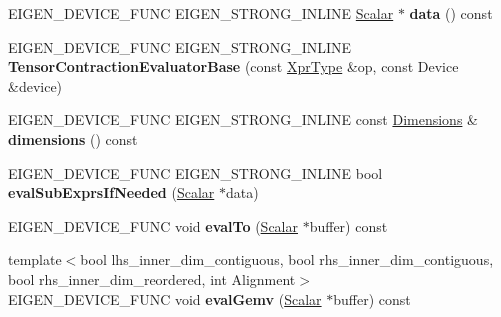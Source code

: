\begin{DoxyCompactItemize}
E\+I\+G\+E\+N\+\_\+\+D\+E\+V\+I\+C\+E\+\_\+\+F\+U\+NC E\+I\+G\+E\+N\+\_\+\+S\+T\+R\+O\+N\+G\+\_\+\+I\+N\+L\+I\+NE \hyperlink{group___sparse_core___module}{Scalar} $\ast$ {\bfseries data} () const
\item 
\mbox{\label{struct_eigen_1_1_tensor_contraction_evaluator_base_aa793ab4101a2169bdf623cd8128389f0}} 
E\+I\+G\+E\+N\+\_\+\+D\+E\+V\+I\+C\+E\+\_\+\+F\+U\+NC E\+I\+G\+E\+N\+\_\+\+S\+T\+R\+O\+N\+G\+\_\+\+I\+N\+L\+I\+NE {\bfseries Tensor\+Contraction\+Evaluator\+Base} (const \hyperlink{class_eigen_1_1_tensor_contraction_op}{Xpr\+Type} \&op, const Device \&device)
\item 
\mbox{\label{struct_eigen_1_1_tensor_contraction_evaluator_base_ab2fe84953c8813277d2139d064d2b4a7}} 
E\+I\+G\+E\+N\+\_\+\+D\+E\+V\+I\+C\+E\+\_\+\+F\+U\+NC E\+I\+G\+E\+N\+\_\+\+S\+T\+R\+O\+N\+G\+\_\+\+I\+N\+L\+I\+NE const \hyperlink{struct_eigen_1_1_d_sizes}{Dimensions} \& {\bfseries dimensions} () const
\item 
\mbox{\label{struct_eigen_1_1_tensor_contraction_evaluator_base_a0cc230491ac304c0be1d6e3dd934587f}} 
E\+I\+G\+E\+N\+\_\+\+D\+E\+V\+I\+C\+E\+\_\+\+F\+U\+NC E\+I\+G\+E\+N\+\_\+\+S\+T\+R\+O\+N\+G\+\_\+\+I\+N\+L\+I\+NE bool {\bfseries eval\+Sub\+Exprs\+If\+Needed} (\hyperlink{group___sparse_core___module}{Scalar} $\ast$data)
\item 
\mbox{\label{struct_eigen_1_1_tensor_contraction_evaluator_base_a9ac0a3d010ff6a0b6b2512dfc0ea75aa}} 
E\+I\+G\+E\+N\+\_\+\+D\+E\+V\+I\+C\+E\+\_\+\+F\+U\+NC void {\bfseries eval\+To} (\hyperlink{group___sparse_core___module}{Scalar} $\ast$buffer) const
\item 
\mbox{\label{struct_eigen_1_1_tensor_contraction_evaluator_base_a72cf4fd8e6ba21d8048818993ac8c945}} 
{\footnotesize template$<$bool lhs\+\_\+inner\+\_\+dim\+\_\+contiguous, bool rhs\+\_\+inner\+\_\+dim\+\_\+contiguous, bool rhs\+\_\+inner\+\_\+dim\+\_\+reordered, int Alignment$>$ }\\E\+I\+G\+E\+N\+\_\+\+D\+E\+V\+I\+C\+E\+\_\+\+F\+U\+NC void {\bfseries eval\+Gemv} (\hyperlink{group___sparse_core___module}{Scalar} $\ast$buffer) const

\end{DoxyCompactItemize}
